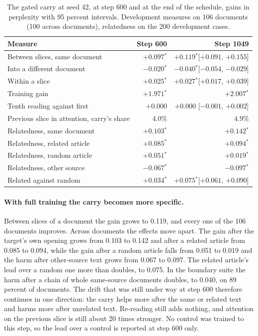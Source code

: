 \documentclass[12pt,a4paper]{report}
\newcommand{\sig}{$^{*}$}
\begin{document}
\begin{table}[H]
  \centering
  \caption{The gated carry at seed 42, at step 600 and at the end of the schedule, gains in perplexity with 95 percent intervals. Development measures on 106 documents (100 across documents), relatedness on the 200 development cases.}
  \label{tab-full-schedule}
  \small
  \begin{tabular}{lrr}
    \toprule
    Measure & Step 600 & Step 1049 \\
    \midrule
    Between slices, same document & $+0.097$\sig & $+0.119$\sig {\footnotesize [$+0.091$, $+0.155$]} \\
    Into a different document & $-0.020$\sig & $-0.040$\sig {\footnotesize [$-0.054$, $-0.029$]} \\
    Within a slice & $+0.025$\sig & $+0.027$\sig {\footnotesize [$+0.017$, $+0.039$]} \\
    Training gain & $+1.971$\sig & $+2.007$\sig \\
    Tenth reading against first & $+0.000$ & $+0.000$ {\footnotesize [$-0.001$, $+0.002$]} \\
    Previous slice in attention, carry's share & 4.0\% & 4.9\% \\
    \midrule
    Relatedness, same document & $+0.103$\sig & $+0.142$\sig \\
    Relatedness, related article & $+0.085$\sig & $+0.094$\sig \\
    Relatedness, random article & $+0.051$\sig & $+0.019$\sig \\
    Relatedness, other source & $-0.067$\sig & $-0.097$\sig \\
    Related against random & $+0.034$\sig & $+0.075$\sig {\footnotesize [$+0.061$, $+0.090$]} \\
    \bottomrule
  \end{tabular}
\end{table}

\paragraph{With full training the carry becomes more specific.} Between slices of a document the gain grows to 0.119, and every one of the 106 documents improves. Across documents the effects move apart. The gain after the target's own opening grows from 0.103 to 0.142 and after a related article from 0.085 to 0.094, while the gain after a random article falls from 0.051 to 0.019 and the harm after other-source text grows from 0.067 to 0.097. The related article's lead over a random one more than doubles, to 0.075. In the boundary suite the harm after a chain of whole same-source documents doubles, to 0.040, on 89 percent of documents. The drift that was still under way at step 600 therefore continues in one direction: the carry helps more after the same or related text and harms more after unrelated text. Re-reading still adds nothing, and attention on the previous slice is still about 20 times stronger. No control was trained to this step, so the lead over a control is reported at step 600 only.
\end{document}
